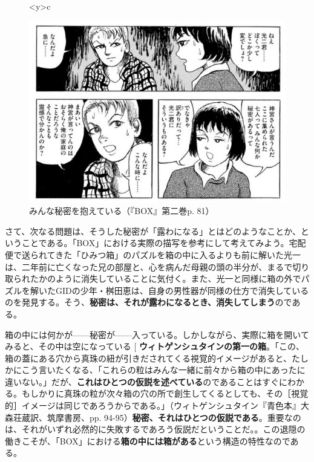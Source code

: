 \documentclass[b5j,twoside,twocolumn]{utarticle}
\makeatletter
\def\yakuchu{%
\@ifnextchar[\@xfootnote %
{\stepcounter{yakuchu}%
\protected@xdef\@thefnmark{\theyakuchu}%
\@footnotemark\@footnotetext}}
\makeatother
\begin{document}
\begin{figure}[h]
\begin{tabular}<y>{c}
\begin{minipage}[c]{0.7\hsize}
\centering
\includegraphics[scale=0.4]{秘密}
\caption{みんな秘密を抱えている（『BOX』第二巻p. 81）}
\end{minipage}
\end{tabular}
\end{figure}

さて、次なる問題は、そうした秘密が「露わになる」とはどのようなことか、ということである。「BOX」における実際の描写を参考にして考えてみよう。宅配便で送られてきた「ひみつ箱」のパズルを箱の中に入るよりも前に解いた光一は、二年前に亡くなった兄の部屋と、心を病んだ母親の頭の半分が、まるで切り取られたかのように消失していることに気付く。また、光一と同様に箱の外でパズルを解いたGIDの少年・桝田恵は、自身の男性器が同様の仕方で消失しているのを発見する。そう、\textbf{秘密は、それが露わになるとき、消失してしまう}のである。

箱の中には何かが------秘密が------入っている。しかしながら、実際に箱を開いてみると、その中は空になっている\yakuchu{\textbf{ウィトゲンシュタインの第一の箱}。「この、箱の蓋にある穴から真珠の紐が引きだされてくる視覚的イメージがあると、たしかにこう言いたくなる、「これらの粒はみんな一緒に前々から箱の中にあったに違いない。」だが、\textbf{これはひとつの仮説を述べている}のであることはすぐにわかる。もしかりに真珠の粒が次々箱の穴の所で創生してくるとしても、その［視覚的］イメージは同じであろうからである。」（ウィトゲンシュタイン『青色本』大森荘蔵訳、筑摩書房、pp. 94-95）\textbf{秘密、それはひとつの仮説である}。重要なのは、それがいずれ必然的に失敗するであろう仮説だということだ。}。この退隠の働きこそが、「BOX」における\textbf{箱の中には箱がある}という構造の特性なのである。
\end{document}
